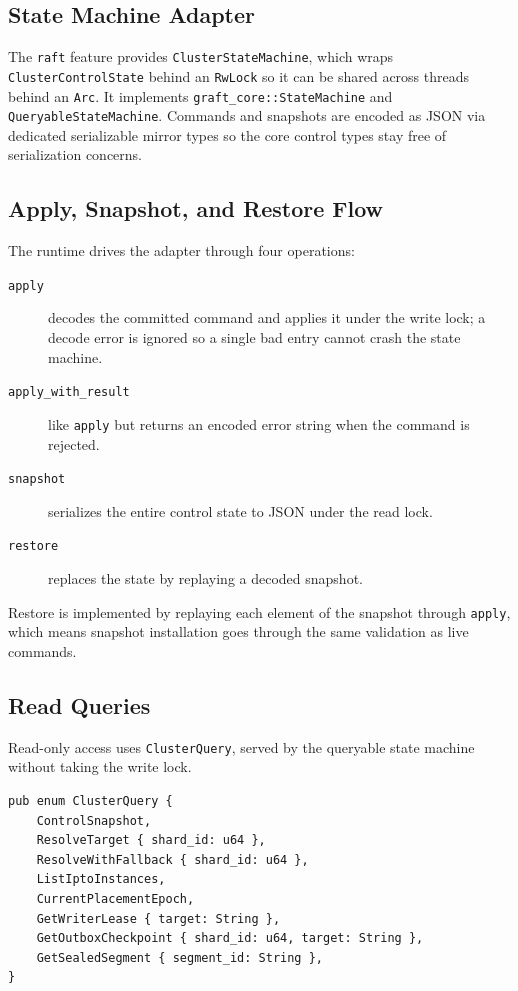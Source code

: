 \subsection{State Machine Adapter}

The \texttt{raft} feature provides \texttt{ClusterStateMachine}, which wraps
\texttt{ClusterControlState} behind an \texttt{RwLock} so it can be shared
across \raft{} threads behind an \texttt{Arc}. It implements
\texttt{graft\_core::StateMachine} and \texttt{QueryableStateMachine}. Commands
and snapshots are encoded as JSON via dedicated serializable mirror types so the
core control types stay free of serialization concerns.

\subsection{Apply, Snapshot, and Restore Flow}

The \raft{} runtime drives the adapter through four operations:

\begin{description}
\item[\texttt{apply}] decodes the committed command and applies it under the
  write lock; a decode error is ignored so a single bad entry cannot crash the
  state machine.
\item[\texttt{apply\_with\_result}] like \texttt{apply} but returns an encoded
  error string when the command is rejected.
\item[\texttt{snapshot}] serializes the entire control state to JSON under the
  read lock.
\item[\texttt{restore}] replaces the state by replaying a decoded snapshot.
\end{description}

Restore is implemented by replaying each element of the snapshot through
\texttt{apply}, which means snapshot installation goes through the same
validation as live commands.

\subsection{Read Queries}

Read-only access uses \texttt{ClusterQuery}, served by the queryable state
machine without taking the write lock.

\begin{lstlisting}
pub enum ClusterQuery {
    ControlSnapshot,
    ResolveTarget { shard_id: u64 },
    ResolveWithFallback { shard_id: u64 },
    ListIptoInstances,
    CurrentPlacementEpoch,
    GetWriterLease { target: String },
    GetOutboxCheckpoint { shard_id: u64, target: String },
    GetSealedSegment { segment_id: String },
}
\end{lstlisting}

